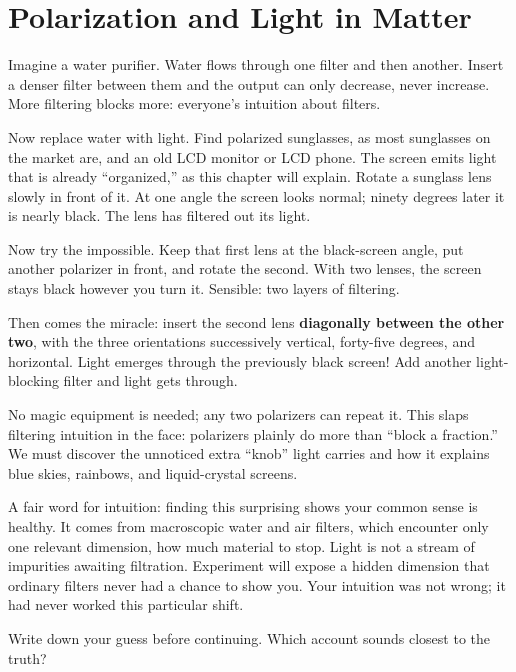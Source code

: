 \chapter{Polarization and Light in Matter}


Imagine a water purifier. Water flows through one filter and then another. Insert a denser filter between them and the output can only decrease, never increase. More filtering blocks more: everyone's intuition about filters.

Now replace water with light. Find polarized sunglasses, as most sunglasses on the market are, and an old LCD monitor or LCD phone. The screen emits light that is already ``organized,'' as this chapter will explain. Rotate a sunglass lens slowly in front of it. At one angle the screen looks normal; ninety degrees later it is nearly black. The lens has filtered out its light.

Now try the impossible. Keep that first lens at the black-screen angle, put another polarizer in front, and rotate the second. With two lenses, the screen stays black however you turn it. Sensible: two layers of filtering.

Then comes the miracle: insert the second lens \textbf{diagonally between the other two}, with the three orientations successively vertical, forty-five degrees, and horizontal. Light emerges through the previously black screen! Add another light-blocking filter and light gets through.

No magic equipment is needed; any two polarizers can repeat it. This slaps filtering intuition in the face: polarizers plainly do more than ``block a fraction.'' We must discover the unnoticed extra ``knob'' light carries and how it explains blue skies, rainbows, and liquid-crystal screens.

A fair word for intuition: finding this surprising shows your common sense is healthy. It comes from macroscopic water and air filters, which encounter only one relevant dimension, how much material to stop. Light is not a stream of impurities awaiting filtration. Experiment will expose a hidden dimension that ordinary filters never had a chance to show you. Your intuition was not wrong; it had never worked this particular shift.


Write down your guess before continuing. Which account sounds closest to the truth?


